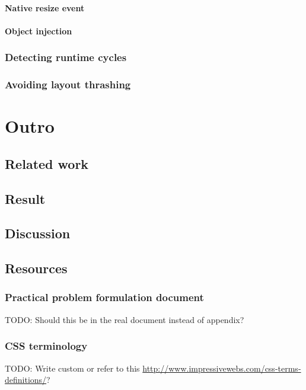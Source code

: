 \documentclass[a4paper,11pt]{kth-mag}
\newcommand\abbr[2][]{\uppercase{#2}\ifthenelse{\equal{#1}{}}%
                     {}{#1}}
\begin{document}
        \subsection{Native resize event}
        \subsection{Object injection}
      \section{Detecting runtime cycles}\label{sec:imp_cycle_detector}
      \section{Avoiding layout thrashing}\label{sec:imp_batch_processor}

  \part{Outro}\label{part:outro}
    \chapter{Related work}
    \chapter{Result}
    \chapter{Discussion}
  \clearpage
   
  \printbibliography
    \appendix
    \addappheadtotoc
      \chapter{Resources}
        \section{Practical problem formulation document}\label{sec:problem-formulation}
          TODO: Should this be in the real document instead of appendix?          
        \section{\abbr{css} terminology}
          TODO: Write custom or refer to this \url{http://www.impressivewebs.com/css-terms-definitions/}?
\end{document}
